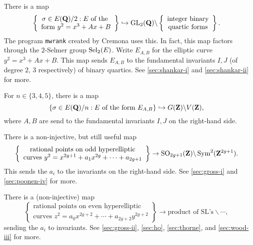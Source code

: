 \begin{example} %
There is a map 
\[
  \left\{\begin{array}{c}\sigma\in E(\mathbf{Q})/2:E\text{ of the } \\ \text{form }y^2=x^3+A x+B\end{array}\right\} \hookrightarrow\operatorname{GL}_2(\mathbf{Q})\backslash \left\{\begin{array}{c}\text{integer binary} \\ \text{quartic forms}\end{array}\right\} .
\]
The program \texttt{mwrank} created by Cremona uses this. In fact, this map 
factors through the $2$-Selmer group $\operatorname{Sel}_2(E)$. Write $E_{A,B}$ for the 
elliptic curve $y^2=x^3+A x+B$. This map sends $E_{A,B}$ to the fundamental 
invariants $I,J$ (of degree $2$, $3$ respectively) of binary quartics. See 
\autoref{sec:shankar-i} and \autoref{sec:shankar-ii} for more. 
\end{example}

\begin{example}
For $n\in \{3,4,5\}$, there is a map 
\[
  \{\sigma \in E(\mathbf{Q})/n:E\text{ of the form }E_{A,B}\} \hookrightarrow G(\mathbf{Z})\backslash V(\mathbf{Z}) ,
\]
where $A,B$ are send to the fundamental invariants $I,J$ on the right-hand 
side. 
\end{example}

\begin{example} %
There is a non-injective, but still useful map 
\[
  \left\{\begin{array}{c}\text{rational points on odd hyperelliptic} \\ \text{curves }y^2=x^{2 g+1} + a_1 x^{2 g} + \cdots + a_{2g+1} \end{array} \right\} \to \operatorname{SO}_{2 g+1}(\mathbf{Z}) \backslash \operatorname{Sym}^2(\mathbf{Z}^{2 g+1}) .
\]
This sends the $a_i$ to the invariants on the right-hand side. See 
\autoref{sec:gross-i} and \autoref{sec:poonen-iv} for more. 
\end{example}

\begin{example} %
There is a (non-injective) map 
\[
  \left\{\begin{array}{c}\text{rational points on even hyperelliptic} \\ \text{curves } z^2=a_0 x^{2 g+2} + \cdots + a_{2 g+2} y^{2 g+2} \end{array} \right\} \to \text{product of SL's} \backslash\cdots ,
\]
sending the $a_i$ to invariants. See \autoref{sec:gross-ii}, 
\autoref{sec:ho}, \autoref{sec:thorne}, and \autoref{sec:wood-iii} for more. 
\end{example}

